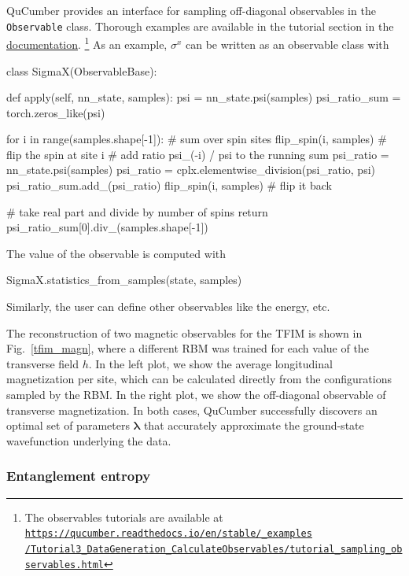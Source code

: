 \documentclass[submission, Phys, hidelnks]{SciPost}
\begin{document}
QuCumber provides an interface for sampling off-diagonal observables in the \verb|Observable| class. Thorough examples are available in the tutorial section in the \href{https://qucumber.readthedocs.io/en/stable/}{documentation}.\!\!
\footnote{The observables tutorials are available at
    \href{https://qucumber.readthedocs.io/en/stable/\_examples/Tutorial3\_DataGeneration\_CalculateObservables/tutorial\_sampling\_observables.html
}{\texttt{https://qucumber.readthedocs.io/en/stable/\_examples\\/Tutorial3\_DataGeneration\_CalculateObservables/tutorial\_sampling\_observables.html}}
}
As an example, $\sigma^x$ can be written as an observable class with
\begin{python}
class SigmaX(ObservableBase):

    def apply(self, nn_state, samples):
        psi = nn_state.psi(samples)
        psi_ratio_sum = torch.zeros_like(psi)

        for i in range(samples.shape[-1]):  # sum over spin sites
            flip_spin(i, samples)  # flip the spin at site i
            # add ratio psi_(-i) / psi to the running sum
            psi_ratio = nn_state.psi(samples)
            psi_ratio = cplx.elementwise_division(psi_ratio, psi)
            psi_ratio_sum.add_(psi_ratio)
            flip_spin(i, samples)  # flip it back

        # take real part and divide by number of spins
        return psi_ratio_sum[0].div_(samples.shape[-1])
\end{python}
The value of the observable is computed with 
\begin{python}
SigmaX.statistics_from_samples(state, samples)
\end{python}
Similarly, the user can define other observables like the energy, etc.

The reconstruction of two magnetic observables for the TFIM is shown in Fig.~\ref{tfim_magn}, where a different RBM was trained for each value of the transverse field $h$. In the left plot, we show the average longitudinal magnetization per site, which can be calculated directly from the configurations sampled by the RBM. In the right plot, we show the off-diagonal observable of transverse magnetization. In both cases, QuCumber successfully discovers an optimal set of parameters $\bm{\lambda}$ that accurately approximate the ground-state wavefunction underlying the data.


\subsubsection{Entanglement entropy }
\label{sec:swap}
\end{document}
